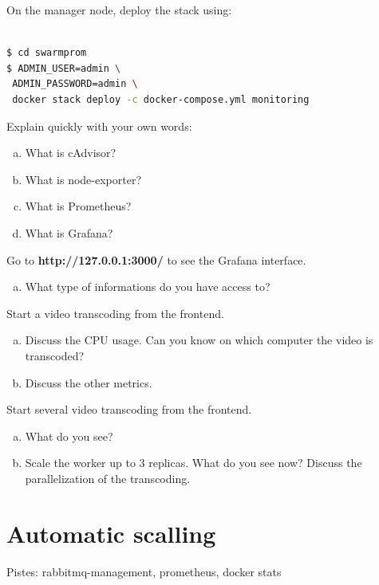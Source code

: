 \documentclass[a4paper,11pt]{exam}
\begin{document}
On the manager node, deploy the stack using: 
\begin{lstlisting}[frame=single,language={sh}]  % Start your code-block

$ cd swarmprom
$ ADMIN_USER=admin \
 ADMIN_PASSWORD=admin \
 docker stack deploy -c docker-compose.yml monitoring
\end{lstlisting}

\begin{questions}
	\question Explain quickly with your own words:
	\begin{enumerate}[(a)]
		\item What is cAdvisor?
		\item What is node-exporter?
		\item What is Prometheus?
		\item What is Grafana?
	\end{enumerate}
	\question Go to \textbf{http://127.0.0.1:3000/} to see the Grafana interface.
	\begin{enumerate}[(a)]
		\item What type of informations do you have access to?
	\end{enumerate}
	\question Start a video transcoding from the frontend.
	\begin{enumerate}[(a)]
		\item Discuss the CPU usage. Can you know on which computer the video is transcoded?
		\item Discuss the other metrics.
	\end{enumerate}

	\question Start several video transcoding from the frontend.
	\begin{enumerate}[(a)]
		\item What do you see?  
		\item Scale the worker up to 3 replicas. What do you see now? Discuss the parallelization of the transcoding.
	\end{enumerate}
\end{questions}


\section{Automatic scalling}

Pistes: rabbitmq-management, prometheus, docker stats
\end{document}
